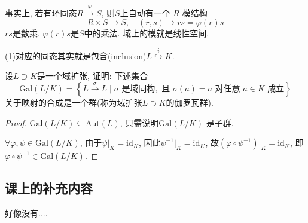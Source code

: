 \documentclass{../solutions-cn}
\begin{document}
\begin{remark}
    事实上, 若有环同态$R \overset{\varphi}\to S$, 则$S$上自动有一个
    $R$-模结构
    \[
        R \times S \to S, \quad (r, s) \mapsto rs = \varphi(r)s
    \]
    $rs$是数乘, $\varphi(r)s$是$S$中的乘法. 域上的模就是线性空间.
    
    (1)对应的同态其实就是包含(inclusion)$L \overset{i}\hookrightarrow K$.
\end{remark}

\begin{exercise}[习题1.4.11]
    设$L \supset K$是一个域扩张, 证明: 下述集合
\[
\mathrm{Gal}(L/K)=
\left\{L \xrightarrow{\sigma} L \mid \sigma\text{ 是域同构},\text{ 且 } \sigma(a) = a \text{ 对任意 } a \in K \text{ 成立}\right\}
\]
关于映射的合成是一个群(称为域扩张$L\supset K$的伽罗瓦群).
\end{exercise}

\begin{proof}
    $\mathrm{Gal}(L/K) \subseteq \mathrm{Aut}(L)$, 只需说明$\mathrm{Gal}(L/K)$
是子群.

    $\forall \varphi, \psi \in \mathrm{Gal}(L/K)$, 由于$\psi|_K = \mathrm{id}_K$,
因此$\psi^{-1}|_K = \mathrm{id}_K$, 故$(\varphi \circ \psi^{-1})|_K = \mathrm{id}_K$,
即$\varphi \circ \psi^{-1} \in \mathrm{Gal}(L/K)$.
\end{proof}

\subsection*{课上的补充内容}
好像没有....
\end{document}
